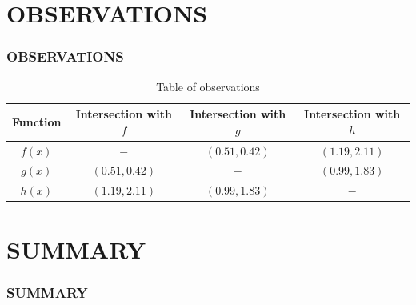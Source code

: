 \documentclass[11pt]{beamer}
\begin{document}
\section{OBSERVATIONS}
\begin{frame}\frametitle{OBSERVATIONS}\label{O}

\begin{table}[h]
\centering
\begin{tabular}{c|c|c|c}
Function&Intersection with $f$&Intersection with $g$&Intersection with $h$\\
\hline
\hline
$f(x)$&$-$&$(0.51,0.42)$&$(1.19,2.11)$\\
\hline
$g(x)$&$(0.51,0.42)$&$-$&$(0.99,1.83)$\\
\hline
$h(x)$&$(1.19,2.11)$&$(0.99,1.83)$&$-$\\
\hline

\end{tabular}
\caption{Table of observations}
\end{table}

\end{frame}
\section{SUMMARY}
\begin{frame}\frametitle{SUMMARY}

\hyperlink{TP}{}\\
\hyperlink{TOC}{}\\
\hyperlink{TF}{}\\
\hyperlink{O}{}

\end{frame}
\end{document}
